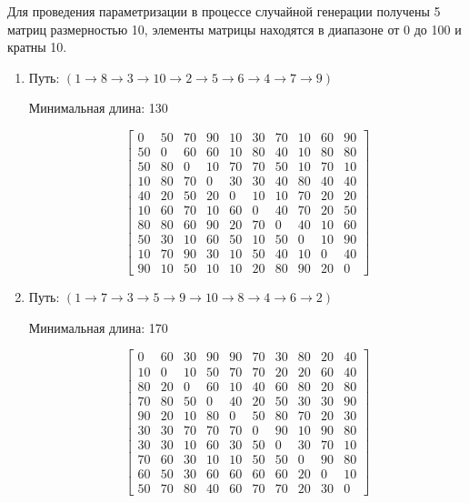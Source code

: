 \documentclass[a4paper,12pt]{article}
\begin{document}
Для проведения параметризации в процессе случайной
генерации получены 5 матриц
размерностью 10, элементы матрицы находятся
в диапазоне от 0 до 100 и кратны 10.

\begin{enumerate}
\item
Путь: $( 1 \rightarrow 8 \rightarrow 3 \rightarrow 10 \rightarrow 2 \rightarrow 5 \rightarrow 6 \rightarrow 4 \rightarrow 7 \rightarrow 9 )$

Минимальная длина: 130

\[
\begin{bmatrix}
0& 50& 70& 90& 10& 30& 70& 10& 60& 90\\
50& 0& 60& 60& 10& 80& 40& 10& 80& 80\\
50& 80& 0& 10& 70& 70& 50& 10& 70& 10\\
10& 80& 70& 0& 30& 30& 40& 80& 40& 40\\
40& 20& 50& 20& 0& 10& 10& 70& 20& 20\\
10& 60& 70& 10& 60& 0& 40& 70& 20& 50\\
80& 80& 60& 90& 20& 70& 0& 40& 10& 60\\
50& 30& 10& 60& 50& 10& 50& 0& 10& 90\\
10& 70& 90& 30& 10& 50& 40& 10& 0& 40\\
90& 10& 50& 10& 10& 20& 80& 90& 20& 0
\end{bmatrix}
\]

\item
Путь: $( 1 \rightarrow 7 \rightarrow 3 \rightarrow 5 \rightarrow 9 \rightarrow 10 \rightarrow 8 \rightarrow 4 \rightarrow 6 \rightarrow 2 )$

Минимальная длина: 170

\[
\begin{bmatrix}
0& 60& 30& 90& 90& 70& 30& 80& 20& 40\\
10& 0& 10& 50& 70& 70& 20& 20& 60& 40\\
80& 20& 0& 60& 10& 40& 60& 80& 20& 80\\
70& 80& 50& 0& 40& 20& 50& 30& 30& 90\\
90& 20& 10& 80& 0& 50& 80& 70& 20& 30\\
30& 30& 70& 70& 70& 0& 90& 10& 90& 80\\
30& 30& 10& 60& 30& 50& 0& 30& 70& 10\\
70& 60& 30& 10& 10& 50& 50& 0& 90& 80\\
60& 50& 30& 60& 60& 60& 60& 20& 0& 10\\
50& 70& 80& 40& 60& 70& 70& 20& 30& 0
\end{bmatrix}
\]


\end{enumerate}
\end{document}
